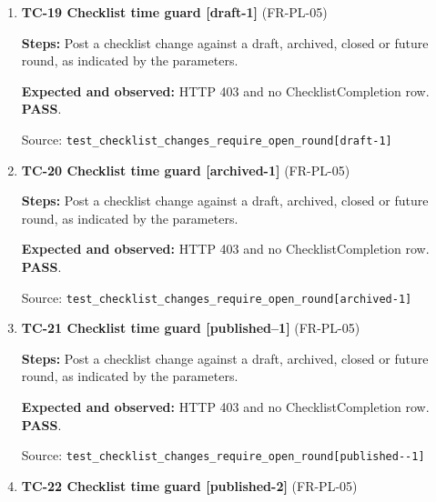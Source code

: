 \begin{enumerate}
\item \begin{minipage}[t]{\linewidth}\textbf{TC-19 Checklist time guard [draft-1]} (FR-PL-05)\par

\textbf{Steps:} Post a checklist change against a draft, archived, closed or future round, as indicated by the parameters.\par

\textbf{Expected and observed:} HTTP 403 and no ChecklistCompletion row. \textbf{PASS}.\par

{\footnotesize Source: \nolinkurl{test_checklist_changes_require_open_round[draft-1]}}\end{minipage}

\item \begin{minipage}[t]{\linewidth}\textbf{TC-20 Checklist time guard [archived-1]} (FR-PL-05)\par

\textbf{Steps:} Post a checklist change against a draft, archived, closed or future round, as indicated by the parameters.\par

\textbf{Expected and observed:} HTTP 403 and no ChecklistCompletion row. \textbf{PASS}.\par

{\footnotesize Source: \nolinkurl{test_checklist_changes_require_open_round[archived-1]}}\end{minipage}

\item \begin{minipage}[t]{\linewidth}\textbf{TC-21 Checklist time guard [published--1]} (FR-PL-05)\par

\textbf{Steps:} Post a checklist change against a draft, archived, closed or future round, as indicated by the parameters.\par

\textbf{Expected and observed:} HTTP 403 and no ChecklistCompletion row. \textbf{PASS}.\par

{\footnotesize Source: \nolinkurl{test_checklist_changes_require_open_round[published--1]}}\end{minipage}

\item \begin{minipage}[t]{\linewidth}\textbf{TC-22 Checklist time guard [published-2]} (FR-PL-05)\par


\end{minipage}
\end{enumerate}
